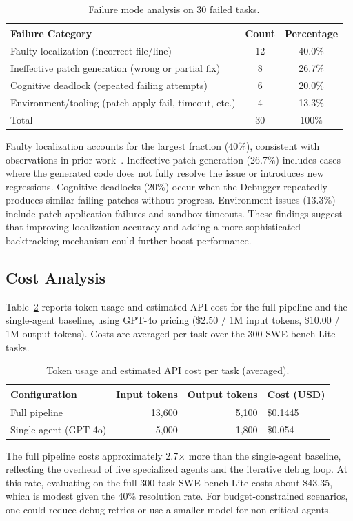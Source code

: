 \begin{table}[t]
\centering
\caption{Failure mode analysis on 30 failed tasks.}
\label{tab:errors}
\begin{tabular}{lcc}
\toprule
Failure Category & Count & Percentage \\
\midrule
Faulty localization (incorrect file/line) & 12 & 40.0\% \\
Ineffective patch generation (wrong or partial fix) & 8 & 26.7\% \\
Cognitive deadlock (repeated failing attempts) & 6 & 20.0\% \\
Environment/tooling (patch apply fail, timeout, etc.) & 4 & 13.3\% \\
\midrule
Total & 30 & 100\% \\
\bottomrule
\end{tabular}
\end{table}

Faulty localization accounts for the largest fraction (40\%), consistent with observations in prior work~\cite{??}. Ineffective patch generation (26.7\%) includes cases where the generated code does not fully resolve the issue or introduces new regressions. Cognitive deadlocks (20\%) occur when the Debugger repeatedly produces similar failing patches without progress. Environment issues (13.3\%) include patch application failures and sandbox timeouts. These findings suggest that improving localization accuracy and adding a more sophisticated backtracking mechanism could further boost performance.

\subsection{Cost Analysis}
\label{sec:cost}

Table~\ref{tab:cost} reports token usage and estimated API cost for the full \texttt{\agentforge{}} pipeline and the single-agent baseline, using GPT-4o pricing (\$2.50 / 1M input tokens, \$10.00 / 1M output tokens). Costs are averaged per task over the 300 SWE-bench Lite tasks.

\begin{table}[t]
\centering
\caption{Token usage and estimated API cost per task (averaged).}
\label{tab:cost}
\begin{tabular}{lrrl}
\toprule
Configuration & Input tokens & Output tokens & Cost (USD) \\
\midrule
Full pipeline & 13,600 & 5,100 & \$0.1445 \\
Single-agent (GPT-4o) & 5,000 & 1,800 & \$0.054 \\
\bottomrule
\end{tabular}
\end{table}

The full pipeline costs approximately 2.7× more than the single-agent baseline, reflecting the overhead of five specialized agents and the iterative debug loop. At this rate, evaluating on the full 300‑task SWE-bench Lite costs about \$43.35, which is modest given the 40\% resolution rate. For budget‑constrained scenarios, one could reduce debug retries or use a smaller model for non‑critical agents.